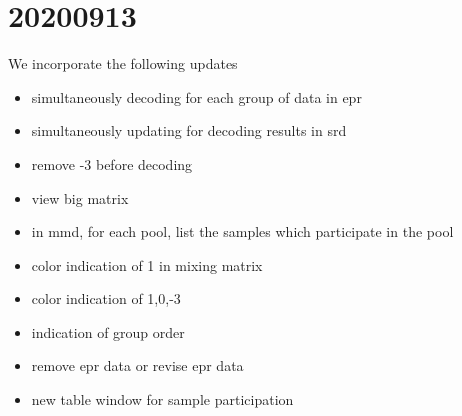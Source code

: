 \documentclass{article}
\theoremstyle{remark}
\begin{document}
\section{20200913}\label{Sec:20200913}

We incorporate the following updates

\begin{itemize}
	\item simultaneously decoding for each group of data in epr 
	
	\item simultaneously updating for decoding results in srd
	
	\item remove -3 before decoding
	
	\item view big matrix
	
	\item in mmd, for each pool, list the samples which participate in the pool
	
	\item color indication of 1 in mixing matrix
	
	\item color indication of 1,0,-3
	
	\item indication of group order
	
	\item remove epr data or revise epr data
	
	\item new table window for sample participation
	
\end{itemize}
\end{document}
